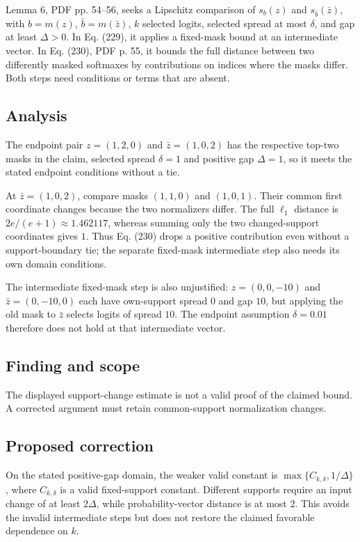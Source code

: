 \documentclass[11pt]{article}
\begin{document}
Lemma 6, PDF pp. 54–56, seeks a Lipschitz comparison of \(s_b(z)\) and \(s_{\bar b}(\bar z)\), with \(b=m(z)\), \(\bar b=m(\bar z)\), \(k\) selected logits, selected spread at most \(\delta\), and gap at least \(\Delta>0\). In Eq. (229), it applies a fixed-mask bound at an intermediate vector. In Eq. (230), PDF p. 55, it bounds the full distance between two differently masked softmaxes by contributions on indices where the masks differ. Both steps need conditions or terms that are absent.

\subsection*{Analysis}

The endpoint pair \(z=(1,2,0)\) and \(\bar z=(1,0,2)\) has the respective top-two masks in the claim, selected spread \(\delta=1\) and positive gap \(\Delta=1\), so it meets the stated endpoint conditions without a tie.

At \(\bar z=(1,0,2)\), compare masks \((1,1,0)\) and \((1,0,1)\). Their common first coordinate changes because the two normalizers differ. The full \(\ell_1\) distance is \(2e/(e+1)\approx1.462117\), whereas summing only the two changed-support coordinates gives \(1\). Thus Eq. (230) drops a positive contribution even without a support-boundary tie; the separate fixed-mask intermediate step also needs its own domain conditions.

The intermediate fixed-mask step is also unjustified: \(z=(0,0,-10)\) and \(\bar z=(0,-10,0)\) each have own-support spread \(0\) and gap \(10\), but applying the old mask to \(\bar z\) selects logits of spread \(10\). The endpoint assumption \(\delta=0.01\) therefore does not hold at that intermediate vector.

\subsection*{Finding and scope}

The displayed support-change estimate is not a valid proof of the claimed bound. A corrected argument must retain common-support normalization changes.

\subsection*{Proposed correction}

On the stated positive-gap domain, the weaker valid constant is \(\max\{C_{k,\delta},1/\Delta\}\), where \(C_{k,\delta}\) is a valid fixed-support constant. Different supports require an input change of at least \(2\Delta\), while probability-vector distance is at most \(2\). This avoids the invalid intermediate steps but does not restore the claimed favorable dependence on \(k\).
\end{document}
